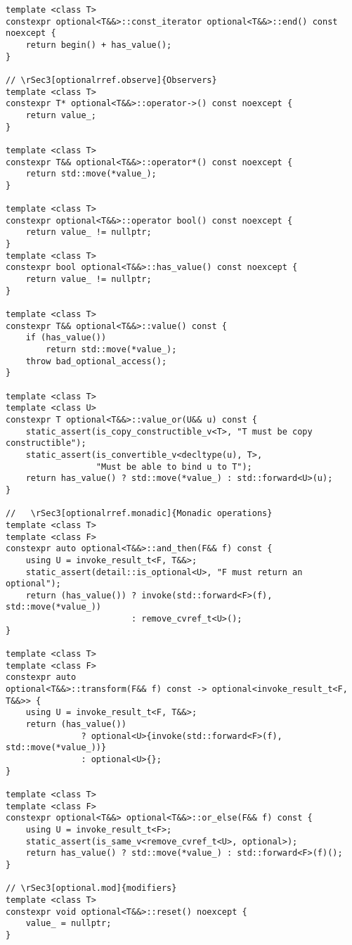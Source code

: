 \documentclass[a4paper,10pt,oneside,openany,final,article]{memoir}
\begin{document}
\begin{verbatim}
template <class T>
constexpr optional<T&&>::const_iterator optional<T&&>::end() const noexcept {
    return begin() + has_value();
}

// \rSec3[optionalrref.observe]{Observers}
template <class T>
constexpr T* optional<T&&>::operator->() const noexcept {
    return value_;
}

template <class T>
constexpr T&& optional<T&&>::operator*() const noexcept {
    return std::move(*value_);
}

template <class T>
constexpr optional<T&&>::operator bool() const noexcept {
    return value_ != nullptr;
}
template <class T>
constexpr bool optional<T&&>::has_value() const noexcept {
    return value_ != nullptr;
}

template <class T>
constexpr T&& optional<T&&>::value() const {
    if (has_value())
        return std::move(*value_);
    throw bad_optional_access();
}

template <class T>
template <class U>
constexpr T optional<T&&>::value_or(U&& u) const {
    static_assert(is_copy_constructible_v<T>, "T must be copy constructible");
    static_assert(is_convertible_v<decltype(u), T>,
                  "Must be able to bind u to T");
    return has_value() ? std::move(*value_) : std::forward<U>(u);
}

//   \rSec3[optionalrref.monadic]{Monadic operations}
template <class T>
template <class F>
constexpr auto optional<T&&>::and_then(F&& f) const {
    using U = invoke_result_t<F, T&&>;
    static_assert(detail::is_optional<U>, "F must return an optional");
    return (has_value()) ? invoke(std::forward<F>(f), std::move(*value_))
                         : remove_cvref_t<U>();
}

template <class T>
template <class F>
constexpr auto
optional<T&&>::transform(F&& f) const -> optional<invoke_result_t<F, T&&>> {
    using U = invoke_result_t<F, T&&>;
    return (has_value())
               ? optional<U>{invoke(std::forward<F>(f), std::move(*value_))}
               : optional<U>{};
}

template <class T>
template <class F>
constexpr optional<T&&> optional<T&&>::or_else(F&& f) const {
    using U = invoke_result_t<F>;
    static_assert(is_same_v<remove_cvref_t<U>, optional>);
    return has_value() ? std::move(*value_) : std::forward<F>(f)();
}

// \rSec3[optional.mod]{modifiers}
template <class T>
constexpr void optional<T&&>::reset() noexcept {
    value_ = nullptr;
}

\end{verbatim}
\end{document}
